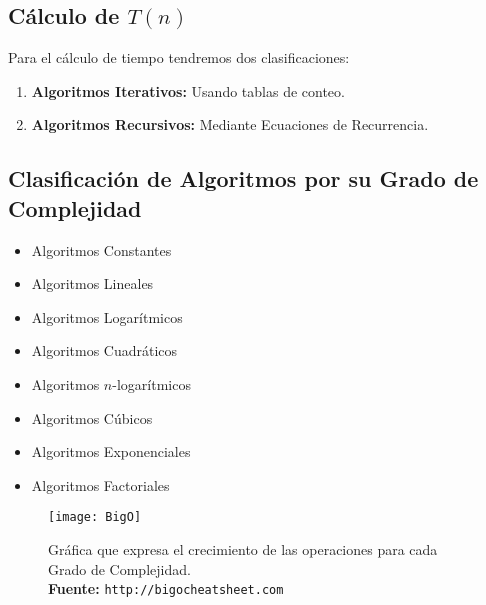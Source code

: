 \subsection{Cálculo de $T(n)$}
Para el cálculo de tiempo tendremos dos clasificaciones:
\begin{enumerate}
\item \textbf{Algoritmos Iterativos:} Usando tablas de conteo.
\item \textbf{Algoritmos Recursivos:} Mediante Ecuaciones de Recurrencia.
\end{enumerate}
\subsection{Clasificación de Algoritmos por su Grado de Complejidad}
\begin{multicols}{2}
\begin{itemize}
\item Algoritmos Constantes
\item Algoritmos Lineales
\item Algoritmos Logarítmicos
\item Algoritmos Cuadráticos
\end{itemize}
\columnbreak
\begin{itemize}
\item Algoritmos $n$-logarítmicos
\item Algoritmos Cúbicos
\item Algoritmos Exponenciales
\item Algoritmos Factoriales
\end{itemize}
\end{multicols}


\begin{figure}[h]
\centering
\texttt{[image: BigO]}
\captionsetup{justification=centering}
\caption[caption]{\footnotesize Gráfica que expresa el crecimiento de las operaciones para cada Grado de Complejidad. \\ \textbf{Fuente:} \texttt{http://bigocheatsheet.com}}
\end{figure}
